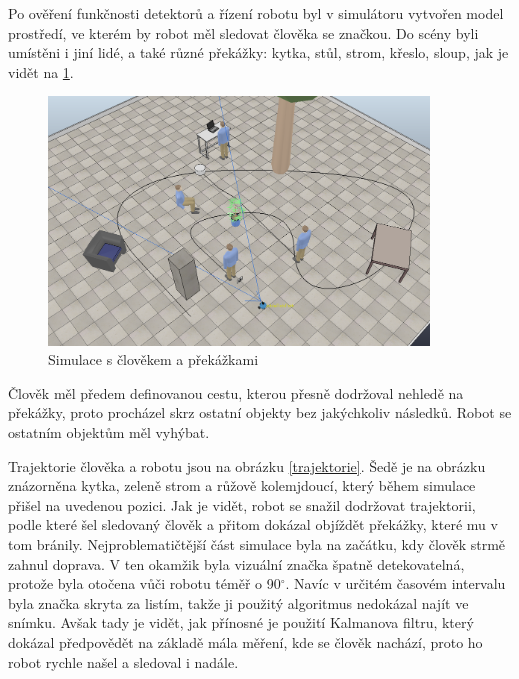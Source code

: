 \documentclass[twoside]{ctuthesis}
\theoremstyle{plain}
\theoremstyle{definition}
\theoremstyle{note}
\begin{document}
Po ověření funkčnosti detektorů a řízení robotu byl v simulátoru vytvořen model prostředí, ve kterém by robot měl sledovat člověka se značkou. Do scény byli umístěni i jiní lidé, a také různé překážky: kytka, stůl, strom, křeslo, sloup, jak je vidět na \ref{lidi}.
\begin{figure}[H]
	\caption{Simulace s člověkem a překážkami}

	\label{lidi}
	\includegraphics[width=0.9\textwidth]{images/5/people.png}
\end{figure}
Člověk měl předem definovanou cestu, kterou přesně dodržoval nehledě na překážky, proto procházel skrz ostatní objekty bez jakýchkoliv následků. Robot se ostatním objektům měl vyhýbat.

Trajektorie člověka a robotu jsou na obrázku \ref{trajektorie}. Šedě je na obrázku znázorněna kytka, zeleně strom a růžově kolemjdoucí, který během simulace přišel na uvedenou pozici. Jak je vidět, robot se snažil dodržovat trajektorii, podle které šel sledovaný člověk a přitom dokázal objíždět překážky, které mu v tom bránily. Nejproblematičtější část simulace byla na začátku, kdy člověk strmě zahnul doprava. V ten okamžik byla vizuální značka špatně detekovatelná, protože byla otočena vůči robotu téměř o 90$^\circ$. Navíc v určitém časovém intervalu byla značka skryta za listím, takže ji použitý algoritmus nedokázal najít ve snímku. Avšak tady je vidět, jak přínosné je použití Kalmanova filtru, který dokázal předpovědět na základě mála měření, kde se člověk nachází, proto ho robot rychle našel a sledoval i nadále.
\end{document}
